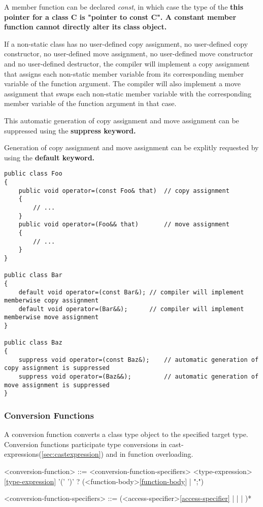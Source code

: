 \documentclass[a4paper,oneside,11pt]{article}
\begin{document}
A member function can be declared \emph{const}, in which case the type of the \bf{this} pointer
for a class C is "pointer to \bf{const} C".
A constant member function cannot directly alter its class object.

If a non-static class has no user-defined copy assignment, no user-defined copy constructor,
no user-defined move assignment, no user-defined move constructor and no user-defined destructor,
the compiler will implement a copy assignment that assigns each non-static member variable
from its corresponding member variable of the function argument.
The compiler will also implement a move assignment that swaps each non-static member variable
with the corresponding member variable of the function argument in that case.

This automatic generation of copy assignment and move assignment can be suppressed using the
\bf{suppress} keyword.

Generation of copy assignment and move assignment can be explitly requested by using the \bf{default} keyword.

\begin{lstlisting}[frame=trBL]
public class Foo
{
    public void operator=(const Foo& that)  // copy assignment
    {
        // ...
    }
    public void operator=(Foo&& that)       // move assignment
    {
        // ...
    }
}

public class Bar
{
    default void operator=(const Bar&); // compiler will implement memberwise copy assignment
    default void operator=(Bar&&);      // compiler will implement memberwise move assignment
}

public class Baz
{
    suppress void operator=(const Baz&);    // automatic generation of copy assignment is suppressed
    suppress void operator=(Baz&&);         // automatic generation of move assignment is suppressed
}
\end{lstlisting}

\subsubsection{Conversion Functions}\label{sec:conversionfunctions}

A conversion function converts a class type object to the specified target type.
Conversion functions participate type conversions in cast-expressions(\ref{sec:castexpression}) and in function overloading.

\begin{grammar}
\label{conversion-function}<conversion-function> ::= <conversion-function-specifiers> 
<type-expression>\ref{type-expression} '(' ')' ? (<function-body>\ref{function-body} | ";")

<conversion-function-specifiers> ::= (<access-specifier>\ref{access-specifier} |  |  | )*
\end{grammar}
\end{document}
